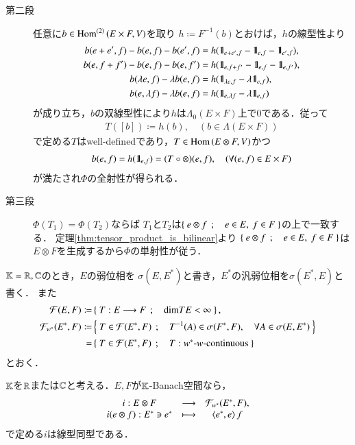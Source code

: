 \begin{prf}
\begin{description}
			\item[第二段]
				任意に$b \in \mathrm{Hom}^{(2)} \left(E \times F,V\right)$を取り
				$h \coloneqq F^{-1}(b)$とおけば，$h$の線型性より
				\begin{align}
					b(e+e',f) - b(e,f) - b(e',f)
					&= h(\defunc_{e+e',f} - \defunc_{e,f} - \defunc_{e',f}), \\
					b(e,f+f') - b(e,f) - b(e,f')
					&= h(\defunc_{e,f+f'} - \defunc_{e,f} - \defunc_{e,f'}), \\
					b(\lambda e,f) - \lambda b(e,f)
					&= h(\defunc_{\lambda e,f} - \lambda \defunc_{e,f}), \\
					b(e,\lambda f) - \lambda b(e,f)
					&= h(\defunc_{e,\lambda f} - \lambda \defunc_{e,f})
				\end{align}
				が成り立ち，$b$の双線型性により$h$は$\Lambda_0(E \times F)$上で0である．従って
				\begin{align}
					T([b]) \coloneqq h(b),
					\quad (b \in \Lambda(E \times F))
				\end{align}
				で定める$T$はwell-definedであり，$T \in \mathrm{Hom} \left(E \otimes F,V\right)$かつ
				\begin{align}	
					b(e,f) = h(\mbox{1}\hspace{-0.25em}\mbox{l}_{e,f}) = (T \circ \otimes) (e,f),
					\quad (\forall (e,f) \in E \times F)
				\end{align}
				が満たされ$\Phi$の全射性が得られる．
				
			\item[第三段]
				$\Phi(T_1) = \Phi(T_2)$ならば
				$T_1$と$T_2$は$\left\{\ e \otimes f\ \, ; \quad e \in E,\ f \in F\ \right\}$の上で一致する．
				定理\ref{thm:tensor_product_is_bilinear}より
				$\left\{\ e \otimes f\ \, ; \quad e \in E,\ f \in F\ \right\}$は
				$E \otimes F$を生成するから$\Phi$の単射性が従う．
				\QED
		\end{description}
	\end{prf}
	
	$\mathbb{K}=\mathbb{R},\mathbb{C}$のとき，$E$の弱位相を
	$\sigma(E,E^*)$と書き，$E^*$の汎弱位相を$\sigma(E^*,E)$と書く．
	また
	\begin{align}
		\mathcal{F}(E,F)
		\coloneqq &\left\{\ T:E \longrightarrow F\ \, ; \quad \mathrm{dim}T E < \infty\ \right\}, \\
		\mathcal{F}_{w^*}(E^*,F)
		\coloneqq &\left\{\ T \in \mathcal{F}(E^*,F)\ \, ; \quad T^{-1}(A) \in \sigma(F^*,F),\quad \forall A \in \sigma(E,E^*)\ \right\} \\
		= &\left\{\ T \in \mathcal{F}(E^*,F)\ \, ; \quad T : \mbox{$w^*$-$w$-continuous}\ \right\}
	\end{align}
	とおく．
	
	\begin{screen}
		\begin{thm}
			$\mathbb{K}$を$\mathbb{R}$または$\mathbb{C}$と考える．$E,F$が$\mathbb{K}$-Banach空間なら，
			\begin{align}
				\begin{array}{ccc}
					i:E \otimes F & \longrightarrow & \mathcal{F}_{w^*}(E^*,F), \\
					i(e \otimes f): E^* \ni e^* & \longmapsto & \inprod<e^*,e>f 
				\end{array}
			\end{align}
			で定める$i$は線型同型である．
		\end{thm}
	\end{screen}